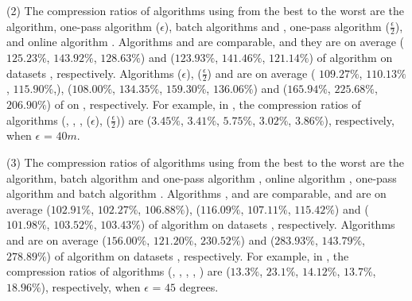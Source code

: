 \sstab(2) The compression ratios of algorithms using \sed from the best
to the worst are the \opt algorithm, one-pass algorithm \cised($\epsilon$), batch algorithms \tpa and
\dpa, one-pass algorithm \cised($\frac{\epsilon}{2}$), and online algorithm \squishe.
%
{Algorithms \tpa and \dpa are comparable, and they are on average
($125.23\%$, $143.92\%$, $128.63\%$) and ($123.93\%$, $141.46\%$, $121.14\%$)
 of algorithm \opt on datasets \dSets, respectively.}
%
{Algorithms \cised(${\epsilon}$), \cised($\frac{\epsilon}{2}$) and \squishe are on average (
  $109.27\%$, $110.13\%$, $115.90\%$,), ($108.00\%$,
  $134.35\%$, $159.30\%$, $136.06\%$) and ($165.94\%$, $225.68\%$, $206.90\%$)
 of \opt on \dSets, respectively.}
%
For example, in \mopsi, the compression ratios of algorithms
(\tpa, \dpa, \squishe, \cised(${\epsilon}$), \cised($\frac{\epsilon}{2}$))
are ($3.45\%$, $3.41\%$, $5.75\%$, $3.02\%$, $3.86\%$), respectively, when $\epsilon$ = $40m$.
%
%
%

\sstab(3) The compression ratios of algorithms using \dad from the best
to the worst are the \opt algorithm, batch algorithm \tpa and
one-pass algorithm \interval, online algorithm \opwa, one-pass algorithm \intersec and batch algorithm \dpa.
%
{Algorithms \tpa, \opwa and \interval are comparable, and are on average
($102.91\%$, $102.27\%$, $106.88\%$), ($116.09\%$, $107.11\%$, $115.42\%$) and ($101.98\%$, $103.52\%$, $103.43\%$)
 of algorithm \opt on datasets \dSets, respectively.}
%
{Algorithms \intersec and \dpa are on average ($156.00\%$, $121.20\%$, $230.52\%$) and ($283.93\%$, $143.79\%$, $278.89\%$)
 of algorithm \opt on datasets \dSets, respectively.}
%
For example, in \mopsi, the compression ratios of algorithms (\tpa, \dpa, \opwa, \interval, \intersec)
are ($13.3\%$, $23.1\%$, $14.12\%$, $13.7\%$, $18.96\%$), respectively, when $\epsilon$ = $45$ degrees.
%


